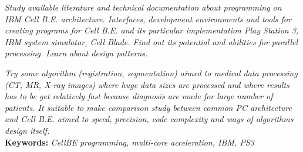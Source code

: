 \par
\textit{
Study available literature and technical documentation about programming on IBM Cell B.E. architecture.
Interfaces, development environments and tools for creating programs for Cell B.E. and its particular implementation Play Station 3, IBM system simulator, Cell Blade.
Find out its potential and abilities for parallel processing. Learn about design patterns.
}

\par
\textit{
Try some algorithm (registration, segmentation) aimed to medical data processing (CT, MR, X-ray images) where huge data sizes are processed and where results has to be get relatively fast because diagnosis are made for large number of patients.
It suitable to make comparison study between common PC architecture and Cell B.E. aimed to speed, precision, code complexity and ways of algorithms design itself.
} \\

\noindent
\textbf{Keywords:} \textit{CellBE programming, multi-core acceleration, IBM, PS3}

\pagebreak